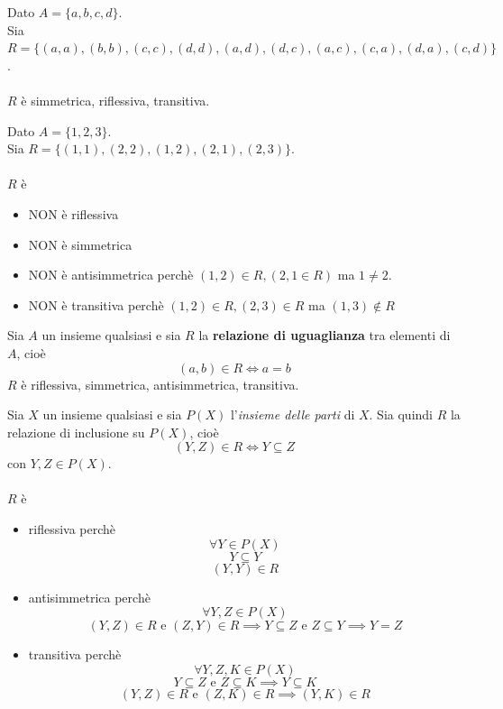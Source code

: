 \documentclass[a4paper,12pt, oneside]{book}
\begin{document}
		\begin{shaded}
			\begin{esempio}
				Dato $A = \{a,b,c,d\}$.\\
				Sia $R = \{(a,a), (b,b), (c,c), (d,d), (a,d), (d,c), (a,c), (c,a), (d,a), (c,d)\}$.\\\\
				$R$ è simmetrica, riflessiva, transitiva.
			\end{esempio}
			\begin{esempio}
				Dato $A = \{1,2,3\}$.\\
				Sia $R = \{(1,1), (2,2), (1,2), (2,1), (2,3)\}$.\\\\
				$R$ è \begin{itemize}
					\item NON è riflessiva
					\item NON è simmetrica
					\item NON è antisimmetrica perchè $(1,2) \in R, (2,1 \in R)$ ma $1 \not = 2$.
					\item NON è transitiva perchè $(1,2) \in R, (2,3) \in R$ ma $(1,3) \not\in R$
				\end{itemize}
			\end{esempio}
			\begin{esempio}
				Sia $A$ un insieme qualsiasi e sia $R$ la \textbf{relazione di uguaglianza} tra elementi di $A$, cioè $$(a,b) \in R \iff a=b$$
				$R$ è riflessiva, simmetrica, antisimmetrica, transitiva.
			\end{esempio}
			\begin{esempio}
				Sia $X$ un insieme qualsiasi e sia $P(X)$ l'\textit{insieme delle parti} di $X$.
				Sia quindi $R$  la relazione di inclusione su $P(X)$, cioè
				$$(Y,Z) \in R \iff Y \subseteq Z $$
				con $Y,Z \in P(X)$.\\\\
				$R$ è \begin{itemize}
					\item riflessiva perchè $$\forall Y \in P(X)$$ $$Y \subseteq Y$$ $$(Y,Y) \in R$$
					\item antisimmetrica perchè $$\forall Y,Z \in P(X)$$ $$(Y,Z) \in R \mbox{ e } (Z,Y) \in R \implies Y \subseteq Z \mbox{ e } Z \subseteq Y \implies Y=Z$$
					\item transitiva perchè $$\forall Y,Z,K \in P(X)$$ $$Y \subseteq Z \mbox{ e } Z \subseteq K \implies Y \subseteq K$$ $$(Y,Z) \in R \mbox{ e } (Z,K) \in R \implies (Y,K) \in R$$
				\end{itemize}
			\end{esempio}
			
		\end{shaded}
\end{document}
